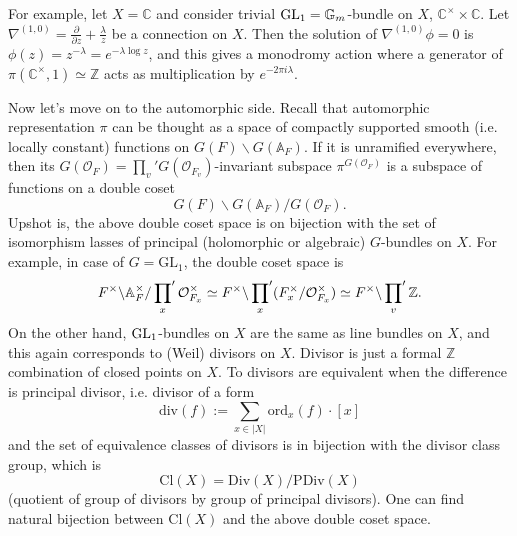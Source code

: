 For example, let $X = \mathbb{C}$ and consider trivial $\operatorname{\mathrm{GL}}_1 = \mathbb{G}_{m}$-bundle on $X$, $\mathbb{C}^{\times} \times \mathbb{C}$.
Let $\nabla^{(1, 0)} = \frac{\partial}{\partial z} + \frac{\lambda}{z}$ be a connection on $X$.
Then the solution of $\nabla^{(1, 0)}\phi = 0$ is $\phi(z) = z^{-\lambda} = e^{-\lambda \log z}$, 
and this gives a monodromy action where a generator of $\pi(\mathbb{C}^{\times}, 1) \simeq \mathbb{Z}$ acts as multiplication by $e^{-2\pi i \lambda}$.

Now let's move on to the automorphic side.
Recall that automorphic representation $\pi$ can be thought as a space of compactly supported
smooth (i.e. locally constant) functions on $G(F)\backslash G(\mathbb{A}_F)$.
If it is unramified everywhere, then its $G(\mathcal{O}_F) = \prod_{v}' G(\mathcal{O}_{F_v})$-invariant subspace 
$\pi^{G(\mathcal{O}_F)}$ is a subspace of functions on a double coset 
$$
G(F) \backslash G(\mathbb{A}_F) / G(\mathcal{O}_F).
$$
Upshot is, the above double coset space is on bijection with the set of isomorphism lasses of principal (holomorphic or algebraic) $G$-bundles on $X$.
For example, in case of $G = \mathrm{GL}_1$, the double coset space is
$$
F^{\times} \backslash \mathbb{A}_F^{\times} / \sideset{}{'}\prod_{x} \mathcal{O}_{F_x}^{\times} \simeq F^{\times} \backslash \sideset{}{'}\prod_{x}(F_{x}^{\times} / \mathcal{O}_{F_{x}}^{\times}) \simeq F^{\times} \backslash \sideset{}{'}\prod_{v}\mathbb{Z}.
$$
On the other hand, $\operatorname{\mathrm{GL}}_1$-bundles on $X$ are the same as line bundles on $X$, 
and this again corresponds to (Weil) divisors on $X$.
Divisor is just a formal $\mathbb{Z}$ combination of closed points on $X$.
To divisors are equivalent when the difference is principal divisor, i.e. divisor of a form
$$
\mathrm{div}(f):= \sum_{x \in |X|} \mathrm{ord}_{x}(f)\cdot [x]
$$
and the set of equivalence classes of divisors is in bijection with the divisor class group, which is
$$
\mathrm{Cl}(X) = \mathrm{Div}(X) / \mathrm{PDiv}(X)
$$
(quotient of group of divisors by group of principal divisors).
One can find natural bijection between $\mathrm{Cl}(X)$ and the above double coset space.

